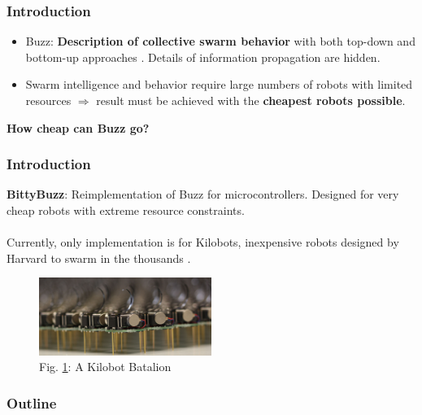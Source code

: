 \documentclass{beamer}
\begin{document}
	\begin{frame}
		\titlepage
	\end{frame}
	\begin{frame}
		\frametitle{Introduction}
		\begin{itemize}
			\item Buzz: \textbf{Description of collective swarm behavior} with both top-down and bottom-up approaches \cite{buzz_arxiv}. Details of information propagation are hidden.
			\item Swarm intelligence and behavior require large numbers of robots with limited resources $\Rightarrow$ result must be achieved with the \textbf{cheapest robots possible}.
		\end{itemize}

		\centering \Large
		\textbf{How cheap can Buzz go?}
	\end{frame}
	\begin{frame}
		\frametitle{Introduction}
		\textbf{BittyBuzz}: Reimplementation of Buzz for microcontrollers. Designed for very cheap robots with extreme resource constraints.\\
		~\\
		Currently, only implementation is for Kilobots, inexpensive robots designed by Harvard to swarm in the thousands \cite{kilobot_paper}.
		\begin{figure}
			\includegraphics[width=0.5\textwidth]{swarm2}
			\caption{\label{figure:Kilobots}Fig. \ref{figure:Kilobots}: A Kilobot Batalion \cite{kilobot_pic}}
		\end{figure}
	\end{frame}
	\begin{frame}
		\frametitle{Outline}
		\tableofcontents
	\end{frame}
\end{document}
